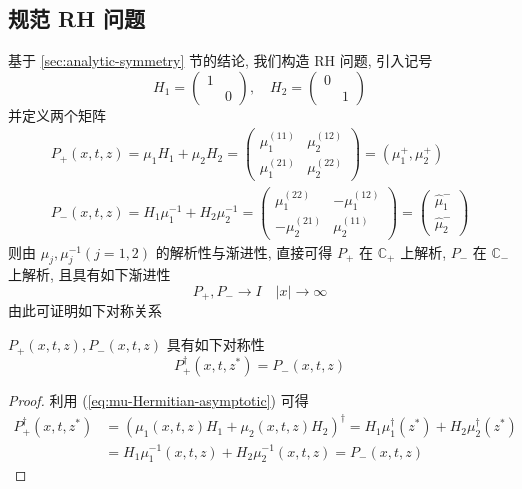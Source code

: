 \subsection{规范 RH 问题}
基于 \ref{sec:analytic-symmetry} 节的结论, 我们构造 RH 问题, 引入记号
\begin{equation}
  H_{1} = \begin{pmatrix}
    1 & \\ & 0
  \end{pmatrix}, \quad 
  H_{2} = \begin{pmatrix}
    0 & \\ & 1
  \end{pmatrix}
\end{equation}
并定义两个矩阵 
\begin{equation}
  \begin{aligned}
    P_{+}(x,t,z) = \mu_{1} H_{1} + \mu_{2} H_{2} = \begin{pmatrix}  \mu_{1}^{(11)} & \mu_{2}^{(12)} \\ \mu_{1}^{(21)} & \mu_{2}^{(22)} \end{pmatrix} = (\mu_{1}^{+}, \mu_{2}^{+}) \\
    P_{-}(x,t,z) =  H_{1} \mu_{1}^{-1} +  H_{2}\mu_{2}^{-1} = \begin{pmatrix}  \mu_{1}^{(22)} & -\mu_{1}^{(12)} \\ -\mu_{2}^{(21)} & \mu_{2}^{(11)} \end{pmatrix} = \begin{pmatrix} \hat{\mu}_{1}^{-} \\ \hat{\mu}_{2}^{-} \end{pmatrix}
  \end{aligned}
\end{equation}
则由 $ \mu_{j}, \mu_{j}^{-1} (j=1,2) $ 的解析性与渐进性, 直接可得 $ P_{+} $ 在 $ \mathbb{C}_{+} $ 上解析, $ P_{-} $ 在 $ \mathbb{C}_{-} $ 上解析, 且具有如下渐进性
\begin{equation}
  P_{+}, P_{-} \to I \quad | x | \to \infty
\end{equation}
由此可证明如下对称关系
\begin{theorem}
  $ P_{+}(x,t,z), P_{-}(x,t,z) $ 具有如下对称性
  \begin{equation}
    P_{+}^{\dagger}(x,t,z^{*}) =  P_{-}(x,t,z) \label{eq:P-symmetry}
  \end{equation}
\end{theorem}
\begin{proof}
  利用 (\ref{eq:mu-Hermitian-asymptotic}) 可得
  \begin{equation}
    \begin{aligned}
    P_{+}^{\dagger}(x,t,z^{*}) &= (\mu_{1}(x,t,z) H_{1} + \mu_{2}(x,t,z) H_{2} )^{\dagger} = H_{1} \mu_{1}^{\dagger}(z^{*}) + H_{2}\mu_{2}^{\dagger}(z^{*}) \\
      &= H_{1}\mu_{1}^{-1}(x,t,z) + H_{2} \mu_{2}^{-1}(x,t,z) = P_{-}(x,t,z)
    \end{aligned}
  \end{equation}
\end{proof}

